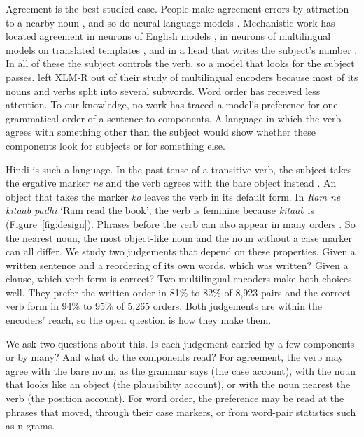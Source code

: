\documentclass[11pt]{article}
\begin{document}
Agreement is the best-studied case.
People make agreement errors by attraction to a nearby noun \citep{bock1991}, and so do neural language models \citep{linzen2016}.
Mechanistic work has located agreement in neurons of English models \citep{finlayson2021}, in neurons of multilingual models on translated templates \citep{mueller2022}, and in a head that writes the subject's number \citep{ferrando2024}.
In all of these the subject controls the verb, so a model that looks for the subject passes.
\citet{mueller2022} left XLM-R out of their study of multilingual encoders because most of its nouns and verbs split into several subwords.
Word order has received less attention.
To our knowledge, no work has traced a model's preference for one grammatical order of a sentence to components.
A language in which the verb agrees with something other than the subject would show whether these components look for subjects or for something else.

Hindi is such a language.
In the past tense of a transitive verb, the subject takes the ergative marker \emph{ne} and the verb agrees with the bare object instead \citep{mohanan1994}.
An object that takes the marker \emph{ko} leaves the verb in its default form.
In \emph{Ram ne kitaab padhi} `Ram read the book', the verb is feminine because \emph{kitaab} is (Figure~\ref{fig:design}).
Phrases before the verb can also appear in many orders \citep{ranjan2022}.
So the nearest noun, the most object-like noun and the noun without a case marker can all differ.
We study two judgements that depend on these properties.
Given a written sentence and a reordering of its own words, which was written?
Given a clause, which verb form is correct?
Two multilingual encoders make both choices well.
They prefer the written order in 81\% to 82\% of 8,923 pairs and the correct verb form in 94\% to 95\% of 5,265 orders.
Both judgements are within the encoders' reach, so the open question is how they make them.

We ask two questions about this.
Is each judgement carried by a few components or by many?
And what do the components read?
For agreement, the verb may agree with the bare noun, as the grammar says (the case account), with the noun that looks like an object (the plausibility account), or with the noun nearest the verb (the position account).
For word order, the preference may be read at the phrases that moved, through their case markers, or from word-pair statistics such as n-grams.
\end{document}
